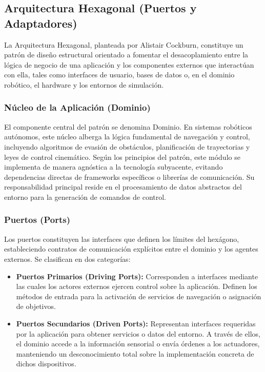 \subsection{Arquitectura Hexagonal (Puertos y Adaptadores)}

La Arquitectura Hexagonal, planteada por Alistair Cockburn, constituye un patrón de diseño estructural orientado a fomentar el desacoplamiento entre la lógica de negocio de una aplicación y los componentes externos que interactúan con ella, tales como interfaces de usuario, bases de datos o, en el dominio robótico, el hardware y los entornos de simulación.

\subsubsection{Núcleo de la Aplicación (Dominio)}
El componente central del patrón se denomina Dominio. En sistemas robóticos autónomos, este núcleo alberga la lógica fundamental de navegación y control, incluyendo algoritmos de evasión de obstáculos, planificación de trayectorias y leyes de control cinemático. Según los principios del patrón, este módulo se implementa de manera agnóstica a la tecnología subyacente, evitando dependencias directas de frameworks específicos o librerías de comunicación. Su responsabilidad principal reside en el procesamiento de datos abstractos del entorno para la generación de comandos de control.

\subsubsection{Puertos (Ports)}
Los puertos constituyen las interfaces que definen los límites del hexágono, estableciendo contratos de comunicación explícitos entre el dominio y los agentes externos. Se clasifican en dos categorías:
\begin{itemize}
    \item \textbf{Puertos Primarios (Driving Ports):} Corresponden a interfaces mediante las cuales los actores externos ejercen control sobre la aplicación. Definen los métodos de entrada para la activación de servicios de navegación o asignación de objetivos.
    \item \textbf{Puertos Secundarios (Driven Ports):} Representan interfaces requeridas por la aplicación para obtener servicios o datos del entorno. A través de ellos, el dominio accede a la información sensorial o envía órdenes a los actuadores, manteniendo un desconocimiento total sobre la implementación concreta de dichos dispositivos.
\end{itemize}

